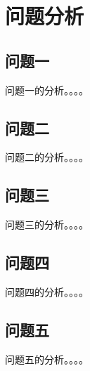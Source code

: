 \section{问题分析}
    \subsection{问题一}
        问题一的分析。。。。
    \subsection{问题二}
        问题二的分析。。。。
    \subsection{问题三}
        问题三的分析。。。。
    \subsection{问题四}
        问题四的分析。。。。
    \subsection{问题五}
        问题五的分析。。。。



